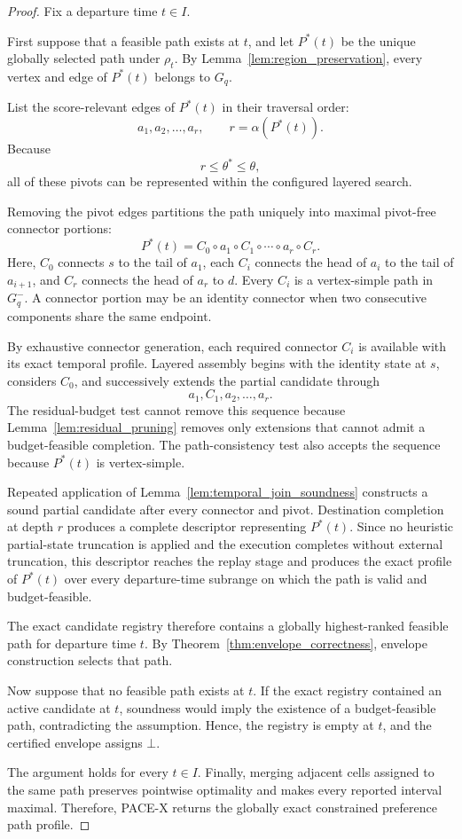 \documentclass[a4paper,fleqn]{cas-dc}
\begin{document}
\begin{proof}
Fix a departure time \(t\in I\).

First suppose that a feasible path exists at \(t\), and let \(P^{*}(t)\) be
the unique globally selected path under \(\rho_t\). By
Lemma~\ref{lem:region_preservation}, every vertex and edge of \(P^{*}(t)\)
belongs to \(G_q\).

List the score-relevant edges of \(P^{*}(t)\) in their traversal order:
\[
a_1,a_2,\ldots,a_r,
\qquad
r=\alpha(P^{*}(t)).
\]
Because
\[
r\leq\theta^{*}\leq\theta,
\]
all of these pivots can be represented within the configured layered search.

Removing the pivot edges partitions the path uniquely into maximal
pivot-free connector portions:
\[
P^{*}(t)
=
C_0
\circ a_1
\circ C_1
\circ\cdots\circ
a_r
\circ C_r.
\]
Here, \(C_0\) connects \(s\) to the tail of \(a_1\), each \(C_i\) connects
the head of \(a_i\) to the tail of \(a_{i+1}\), and \(C_r\) connects the
head of \(a_r\) to \(d\). Every \(C_i\) is a vertex-simple path in
\(G_q^{-}\). A connector portion may be an identity connector when two
consecutive components share the same endpoint.

By exhaustive connector generation, each required connector \(C_i\) is
available with its exact temporal profile. Layered assembly begins with the
identity state at \(s\), considers \(C_0\), and successively extends the
partial candidate through
\[
a_1,C_1,a_2,\ldots,a_r.
\]
The residual-budget test cannot remove this sequence because
Lemma~\ref{lem:residual_pruning} removes only extensions that cannot admit a
budget-feasible completion. The path-consistency test also accepts the
sequence because \(P^{*}(t)\) is vertex-simple.

Repeated application of
Lemma~\ref{lem:temporal_join_soundness} constructs a sound partial candidate
after every connector and pivot. Destination completion at depth \(r\)
produces a complete descriptor representing \(P^{*}(t)\). Since no heuristic
partial-state truncation is applied and the execution completes without
external truncation, this descriptor reaches the replay stage and produces the
exact profile of \(P^{*}(t)\) over every departure-time subrange on which the
path is valid and budget-feasible.

The exact candidate registry therefore contains a globally highest-ranked
feasible path for departure time \(t\). By
Theorem~\ref{thm:envelope_correctness}, envelope construction selects that
path.

Now suppose that no feasible path exists at \(t\). If the exact registry
contained an active candidate at \(t\), soundness would imply the existence of
a budget-feasible path, contradicting the assumption. Hence, the registry is
empty at \(t\), and the certified envelope assigns \(\bot\).

The argument holds for every \(t\in I\). Finally, merging adjacent cells
assigned to the same path preserves pointwise optimality and makes every
reported interval maximal. Therefore, PACE-X returns the globally exact
constrained preference path profile.
\end{proof}
\end{document}
